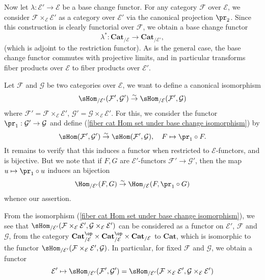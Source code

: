 Now let $\lambda:\mathcal{E}'\to \mathcal{E}$ be a base change functor. For any category $\mathcal{F}$ over $\mathcal{E}$, we consider $\mathcal{F}\times_{\mathcal{E}}\mathcal{E}'$ as a category over $\mathcal{E}'$ via the canonical projection $\pr_2$. Since this construction is clearly functorial over $\mathcal{F}$, we obtain a base change functor
\[\lambda^*:\mathbf{Cat}_{/\mathcal{E}}\to \mathbf{Cat}_{/\mathcal{E}'},\]
(which is adjoint to the restriction functor). As is the general case, the base change functor commutes with projective limits, and in particular transforms fiber products over $\mathcal{E}$ to fiber products over $\mathcal{E}'$.\par
Let $\mathcal{F}$ and $\mathcal{G}$ be two categories over $\mathcal{E}$, we want to define a canonical isomorphism
\begin{equation}\label{fiber cat Hom set under base change isomorphism}
\sHom_{/\mathcal{E}'}(\mathcal{F}',\mathcal{G}')\stackrel{\sim}{\to }\sHom_{/\mathcal{E}}(\mathcal{F}',\mathcal{G})
\end{equation}
where $\mathcal{F}'=\mathcal{F}\times_\mathcal{E}\mathcal{E}'$, $\mathcal{G}'=\mathcal{G}\times_\mathcal{E}\mathcal{E}'$. For this, we consider the functor $\pr_1:\mathcal{G}'\to \mathcal{G}$ and define (\ref{fiber cat Hom set under base change isomorphism}) by
\[\sHom(\mathcal{F}',\mathcal{G}')\stackrel{\sim}{\to }\sHom(\mathcal{F}',\mathcal{G}),\quad F\mapsto\pr_1\circ F.\]
It remains to verify that this induces a functor when restricted to $\mathcal{E}$-functors, and is bijective. But we note that if $F,G$ are $\mathcal{E}'$-functors $\mathcal{F}'\to \mathcal{G}'$, then the map $u\mapsto\pr_1\circ u$ induces an bijection
\[\Hom_{/\mathcal{E}'}(F,G)\stackrel{\sim}{\to }\Hom_{/\mathcal{E}}(F,\pr_1\circ G)\]
whence our assertion.\par
From the isomorphism (\ref{fiber cat Hom set under base change isomorphism}), we see that $\sHom_{/\mathcal{E}'}(\mathcal{F}\times_\mathcal{E}\mathcal{E}',\mathcal{G}\times_\mathcal{E}\mathcal{E}')$ can be considered as a functor on $\mathcal{E}'$, $\mathcal{F}$ and $\mathcal{G}$, from the category $\mathbf{Cat}_{/\mathcal{E}}^{\op}\times\mathbf{Cat}_{/\mathcal{E}}^{\op}\times\mathbf{Cat}_{/\mathcal{E}}$ to $\mathbf{Cat}$, which is isomorphic to the functor $\sHom_{/\mathcal{E}'}(\mathcal{F}\times_\mathcal{E}\mathcal{E}',\mathcal{G})$. In particular, for fixed $\mathcal{F}$ and $\mathcal{G}$, we obtain a functor
\[\mathcal{E}'\mapsto\sHom_{/\mathcal{E}'}(\mathcal{F}',\mathcal{G}')=\sHom_{/\mathcal{E}'}(\mathcal{F}\times_\mathcal{E}\mathcal{E}',\mathcal{G}\times_\mathcal{E}\mathcal{E}')\]
